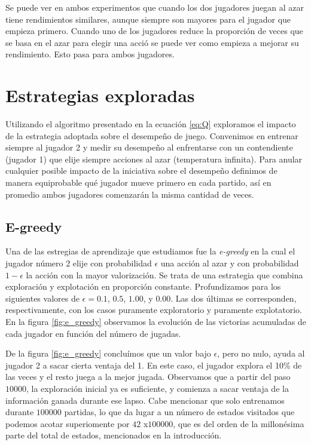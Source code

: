 \documentclass[11pt, spanish]{article}
\begin{document}
\par Se puede ver en ambos experimentos que cuando los dos jugadores juegan al azar tiene rendimientos similares, aunque siempre son mayores para el jugador que empieza primero. Cuando uno de los jugadores reduce la proporci\'on de veces que se basa en el azar para elegir una acci\'o se puede ver como empieza a mejorar su rendimiento. Esto pasa para ambos jugadores. 


\section{Estrategias exploradas}
\par Utilizando el algoritmo presentado en la ecuación \ref{eq:Q} exploramos 
el impacto de la estrategia adoptada sobre el desempeño de juego. Convenimos en 
entrenar siempre al jugador 2 y medir su desempeño al enfrentarse con un 
contendiente (jugador 1) que elije siempre acciones al azar (temperatura 
infinita). Para anular cualquier posible impacto de la iniciativa sobre el 
desempeño definimos de manera equiprobable qué jugador mueve primero en cada 
partido, así en promedio ambos jugadores comenzarán la misma cantidad de veces.

\subsection{E-greedy}
\par Una de las estregias de aprendizaje que estudiamos fue la \emph{e-greedy} 
en la cual el jugador número 2 elije con probabilidad $\epsilon$ una acción al 
azar y con probabilidad $1-\epsilon$ la acción con la mayor valorización. Se 
trata de una estrategia que combina exploración y explotación en proporción 
constante. Profundizamos para los siguientes valores de $\epsilon = 
0.1$, $0.5$, $1.00$, y $0.00$. Las dos últimas se corresponden, respectivamente, 
con los casos puramente exploratorio y puramente explotatorio. En la figura 
\ref{fig:e_greedy} observamos la evolución de las victorias acumuladas de cada 
jugador en función del número de jugadas.
\par De la figura \ref{fig:e_greedy} concluímos que un valor bajo $\epsilon$, 
pero no nulo, ayuda al jugador 2 a sacar cierta ventaja del 1. En este caso, el 
jugador explora el 10\% de las veces y el resto juega a la mejor jugada. 
Observamos que a partir del paso $10000$, la exploración inicial ya es 
suficiente, y comienza a sacar ventaja de la información ganada durante ese 
lapso. Cabe mencionar que solo entrenamos durante $100000$ partidas, lo que da lugar a un número de estados visitados que podemos acotar superiomente por $42$ x$100000$, que es del orden de la millonésima parte del total de estados, mencionados en la introducción.
\end{document}
